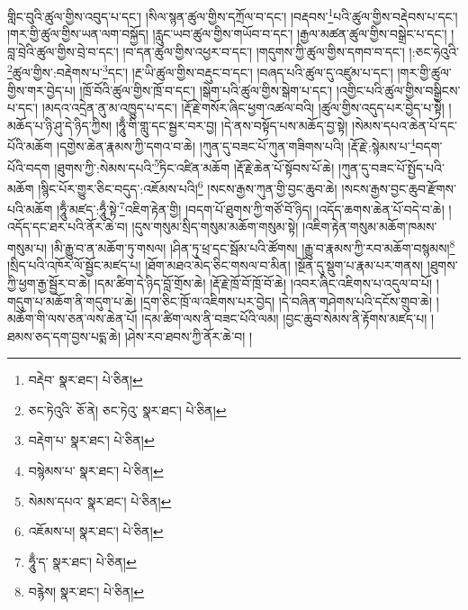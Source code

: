 གླིང་བུའི་ཚུལ་གྱིས་འབུད་པ་དང་། །སིལ་སྙན་ཚུལ་གྱིས་དཀྲོལ་བ་དང་། །བརྡབས་\footnote{བརྡེབ་  སྣར་ཐང་།  པེ་ཅིན། }པའི་ཚུལ་གྱིས་བརྡེབས་པ་དང་། །གར་གྱི་ཚུལ་གྱིས་ཡན་ལག་བསྐྱོད། །རླུང་ཡབ་ཚུལ་གྱིས་གཡོབ་བ་དང་། །རྒྱལ་མཚན་ཚུལ་གྱིས་བསྒྲེང་པ་དང་། །བླ་བྲེའི་ཚུལ་གྱིས་བྲེ་བ་དང་། །བ་དན་ཚུལ་གྱིས་འཕྱར་བ་དང་། །གདུགས་ཀྱི་ཚུལ་གྱིས་དགབ་བ་དང་། །:ཅང་ཧེའུའི་\footnote{ཅང་ཏེའུའི་  ཅོ་ནེ། ཅང་ཏེའུ་  སྣར་ཐང་།  པེ་ཅིན། }ཚུལ་གྱིས་:བརྡེགས་པ་\footnote{བརྡེག་པ་  སྣར་ཐང་།  པེ་ཅིན། }དང་། །རྔ་ཡི་ཚུལ་གྱིས་བརྡུང་བ་དང་། །བཞད་པའི་ཚུལ་དུ་འཛུམ་པ་དང་། །གར་གྱི་ཚུལ་གྱིས་གར་བྱེད་པ། །ཁྲོ་བོའི་ཚུལ་གྱིས་ཁྲོ་བ་དང་། །སྒེག་པའི་ཚུལ་གྱིས་སྒེག་པ་དང་། །འགྱིང་པའི་ཚུལ་གྱིས་བསྒྱིངས་པ་དང་། །མདའ་འདྲེན་ནུ་མ་འཁྱུད་པ་དང་། །རྡོ་རྗེ་གསོར་ཞིང་ཕྱག་འཚལ་བའི། །ཚུལ་གྱིས་འདུད་པར་བྱེད་པ་སྟེ། །མཆོད་པ་ཉི་ཤུ་དེ་ཉིད་ཀྱིས། །ཧཱུྃ་གི་གླུ་དང་སྦྱར་བར་བྱ། །དེ་ནས་བསྟོད་པས་མཆོད་བྱ་སྟེ། །སེམས་དཔའ་ཆེན་པོ་དང་པོའི་མཆོག །དགྱེས་ཆེན་རྣམས་ཀྱི་དགའ་བ་ཆེ། །ཀུན་དུ་བཟང་པོ་ཀུན་གཟིགས་པའི། །རྡོ་རྗེ་:སྙེམས་པ་\footnote{བསྙེམས་པ་  སྣར་ཐང་།  པེ་ཅིན། }བདག་པོའི་བདག །ཐུགས་ཀྱི་:སེམས་དཔའི་\footnote{སེམས་དཔའ་  སྣར་ཐང་།  པེ་ཅིན། }ཏིང་འཛིན་མཆོག །རྡོ་རྗེ་ཆེན་པོ་སྟོབས་པོ་ཆེ། །ཀུན་དུ་བཟང་པོ་སྤྱོད་པའི་མཆོག །སྙིང་པོར་གྱུར་ཅིང་བདུད་:འཇོམས་པའི།\footnote{འཇོམས་པ།  སྣར་ཐང་།  པེ་ཅིན། } །སངས་རྒྱས་ཀུན་གྱི་བྱང་ཆུབ་ཆེ། །སངས་རྒྱས་བྱང་ཆུབ་རྫོགས་པའི་མཆོག །ཧཱུྃ་མཛད་:ཧཱུྃ་སྟེ་\footnote{ཧཱུྃ་ད་  སྣར་ཐང་།  པེ་ཅིན། }འཇིག་རྟེན་གྱི། །བདག་པོ་ཐུགས་ཀྱི་གཙོ་བོ་ཉིད། །འདོད་ཆགས་ཆེན་པོ་བདེ་བ་ཆེ། །འདོད་དང་ཐར་པའི་ནོར་ཆེ་བ། །དུས་གསུམ་སྲིད་གསུམ་མཆོག་གསུམ་སྟེ། །འཇིག་རྟེན་གསུམ་མཆོག་ཁམས་གསུམ་པ། །མི་རྒྱུ་བ་ན་མཆོག་ཏུ་གསལ། །ཤིན་ཏུ་ཕྲ་དང་སྦོམ་པའི་ཚོགས། །རྒྱུ་བ་རྣམས་ཀྱི་རབ་མཆོག་བསྙམས།\footnote{བརྙེས།  སྣར་ཐང་།  པེ་ཅིན། } །སྲིད་པའི་འཁོར་ལོ་སྦྱོང་མཛད་པ། །ཐོག་མཐའ་མེད་ཅིང་གསལ་བ་མིན། །སྔོན་དུ་སྡུག་པ་རྣམ་པར་གནས། །ཐུགས་ཀྱི་ཕྱག་རྒྱ་སྦྱོར་བ་ཆེ། །དམ་ཚིག་དེ་ཉིད་བློ་གྲོས་ཆེ། །རྡོ་རྗེ་ཁྲོ་བོ་ཁྲོ་བོ་ཆེ། །འབར་ཞིང་འཇིགས་པ་འདུལ་བ་པོ། །གདུག་པ་མཆོག་ནི་གདུག་པ་ཆེ། །དྲག་ཅིང་ཁྲོ་ལ་འཇིགས་པར་བྱེད། །དེ་བཞིན་གཤེགས་པའི་དངོས་གྲུབ་ཆེ། །མཆོག་གི་ལས་ཅན་ལས་ཆེན་པོ། །དམ་ཚིག་ལས་ནི་བཟང་པོའི་ལམ། །བྱང་ཆུབ་སེམས་ནི་རྟོགས་མཛད་པ། །ཐམས་ཅད་དག་བྱས་པདྨ་ཆེ། །ཤེས་རབ་ཐབས་ཀྱི་ནོར་ཆེ་བ། །
